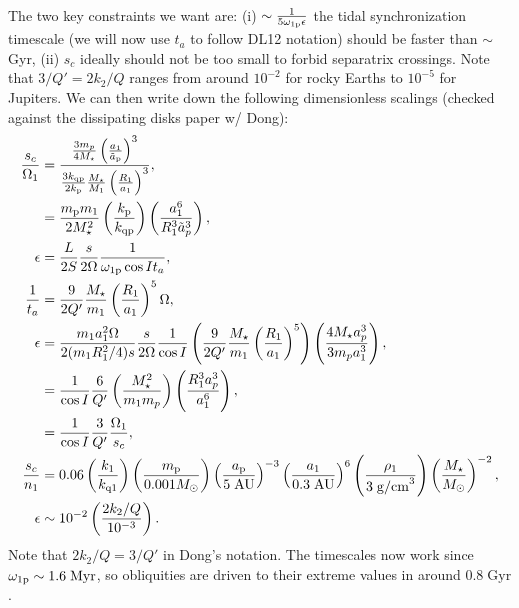 \documentclass[11pt,
        usenames, %
        dvipsnames %
    ]{article}
\newcommand*{\p}[1]{\left(#1\right)}
\begin{document}
The two key constraints we want are: (i) $\sim \frac{1}{5\omega_{\rm
1p}\epsilon}$ the tidal synchronization timescale (we will now use $t_a$ to
follow DL12 notation) should be faster than $\sim$ Gyr, (ii) $s_c$ ideally
should not be too small to forbid separatrix crossings. Note that $3 / Q' = 2k_2
/ Q$ ranges from around $10^{-2}$ for rocky Earths to $10^{-5}$ for Jupiters. We
can then write down the following dimensionless scalings (checked against the
dissipating disks paper w/ Dong):
\begin{align}
    \frac{s_c}{\Omega_1} &= \frac{
        \frac{3m_p}{4M_\star}\p{\frac{a_1}{\tilde{a}_{\rm p}}}^3
            }{\frac{3k_{\rm qp}}{2k_{\rm p}}
            \frac{M_\star}{M_1}\p{\frac{R_1}{a_1}}^3},\\
        &= \frac{m_{\rm p}m_1}{2M_{\star}^2}
            \p{\frac{k_{\rm p}}{k_{\rm qp}}}
            \p{\frac{a_1^6}{R_1^3 \tilde{a}_p^3}},\\
    \epsilon &=\frac{L}{2S}\frac{s}{2\Omega}\frac{1}{\omega_{\rm 1p}\cos I t_a}
            ,\\
    \frac{1}{t_a} &= \frac{9}{2Q'}\frac{M_\star}{m_{\rm 1}}
        \p{\frac{R_1}{a_1}}^5\Omega,\\
    \epsilon &= \frac{m_1a_1^2\Omega}{2(m_1R_1^2/4)s}\frac{s}{2\Omega}
        \frac{1}{\cos I}\p{\frac{9}{2Q'}\frac{M_\star}{m_1}
            \p{\frac{R_1}{a_1}}^5}
            \p{\frac{4M_\star a_p^3}{3m_pa_1^3}},\\
        &= \frac{1}{\cos I}
            \frac{6}{Q'}\p{\frac{M_\star^2}{m_1m_p}}
            \p{\frac{R_1^3a_p^3}{a_1^6}},\\
        &= \frac{1}{\cos I}\frac{3}{Q'}\frac{\Omega_1}{s_c},\\
    \frac{s_c}{n_1} &= 0.06 \p{\frac{k_{\rm 1}}{k_{\rm q1}}}
            \p{\frac{m_{\rm p}}{0.001 M_{\odot}}}
            \p{\frac{a_{\rm p}}{5 \;\mathrm{AU}}}^{-3}
            \p{\frac{a_{\rm 1}}{0.3\;\mathrm{AU}}}^{6}
            \p{\frac{\rho_{\rm 1}}{3 \; \mathrm{g/cm}^3}}
            \p{\frac{M_\star}{M_{\odot}}}^{-2},\\
    \epsilon &\sim 10^{-2} \p{\frac{2k_2/Q}{10^{-3}}}.
\end{align}
Note that $2k_2/Q = 3/Q'$ in Dong's notation. The timescales now work since
$\omega_{\rm 1p} \sim 1.6\;\mathrm{Myr}$, so obliquities are driven to their
extreme values in around $0.8\;\mathrm{Gyr}$.
\end{document}
